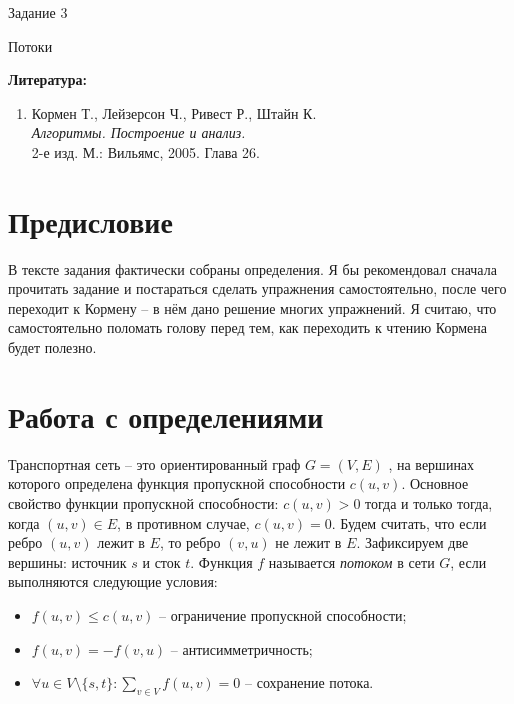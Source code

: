\documentclass[12pt, leqno]{article}
\theoremstyle{definiton}
\theoremstyle{definition}
\theoremstyle{definition}
\let\leq\leqslant
\begin{document}
\centerline{\LARGE Задание 3}

\medskip

\begin{center}
	{\Large Потоки }
\end{center}

\bigskip

{\bf Литература: }
\begin{enumerate}

\item Кормен Т., Лейзерсон Ч., Ривест Р., Штайн К. \\ {\it Алгоритмы. Построение и анализ. }\\  2-е изд. М.: Вильямс, 2005. Глава 26.

\end{enumerate}

\section{Предисловие}

В тексте задания фактически собраны определения. Я бы рекомендовал сначала прочитать задание и постараться сделать упражнения самостоятельно, после чего переходит к Кормену -- в нём дано решение многих упражнений. Я считаю, что самостоятельно поломать голову перед тем, как переходить к чтению Кормена будет полезно.

\section{Работа с определениями}

Транспортная сеть -- это ориентированный граф $G = (V,E)$ , на вершинах которого определена функция пропускной способности $c(u,v)$. Основное свойство функции пропускной способности: $c(u,v) > 0$ тогда и только тогда, когда $(u,v) \in E$, в противном случае, $c(u,v) = 0$. Будем считать, что если ребро $(u,v)$ лежит в $E$, то ребро $(v,u)$ не лежит в $E$.  Зафиксируем две вершины: источник $s$ и сток $t$. Функция $f$ называется \emph{потоком} в сети $G$, если выполняются следующие условия:
\begin{itemize}
	\item $ f(u,v) \leq c(u,v) $ -- ограничение пропускной способности;
	\item $ f(u,v) = -f(v,u) $ -- антисимметричность;
	\item $\forall u \in V\setminus\{s,t\}: \sum_{v\in V} f(u,v)=0$ -- сохранение потока.
\end{itemize}
\end{document}
